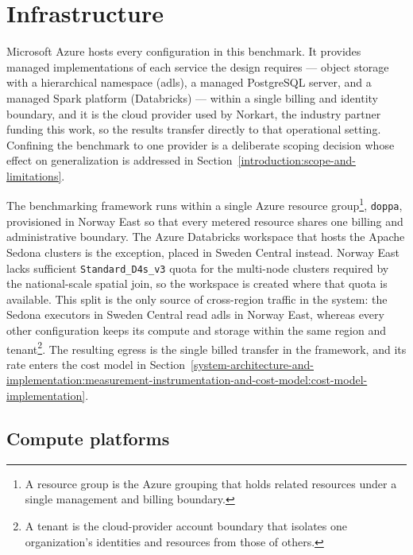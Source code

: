 \section{Infrastructure}
\label{system-architecture-and-implementation:infrastructure}

Microsoft Azure hosts every configuration in this benchmark. It provides managed implementations of each service the design requires --- object storage with a hierarchical namespace (\acrshort{adls}), a managed PostgreSQL server, and a managed Spark platform (Databricks) --- within a single billing and identity boundary, and it is the cloud provider used by Norkart, the industry partner funding this work, so the results transfer directly to that operational setting. Confining the benchmark to one provider is a deliberate scoping decision whose effect on generalization is addressed in Section~\ref{introduction:scope-and-limitations}.

The benchmarking framework runs within a single Azure resource group\footnote{A resource group is the Azure grouping that holds related resources under a single management and billing boundary.}, \texttt{doppa}, provisioned in Norway East so that every metered resource shares one billing and administrative boundary. The Azure Databricks workspace that hosts the Apache Sedona clusters is the exception, placed in Sweden Central instead. Norway East lacks sufficient \texttt{Standard\_D4s\_v3} quota for the multi-node clusters required by the national-scale spatial join, so the workspace is created where that quota is available. This split is the only source of cross-region traffic in the system: the Sedona executors in Sweden Central read \acrshort{adls} in Norway East, whereas every other configuration keeps its compute and storage within the same region and tenant\footnote{A tenant is the cloud-provider account boundary that isolates one organization's identities and resources from those of others.}. The resulting egress is the single billed transfer in the framework, and its rate enters the cost model in Section~\ref{system-architecture-and-implementation:measurement-instrumentation-and-cost-model:cost-model-implementation}.

\subsection{Compute platforms}
\label{system-architecture-and-implementation:infrastructure:compute-platforms}

